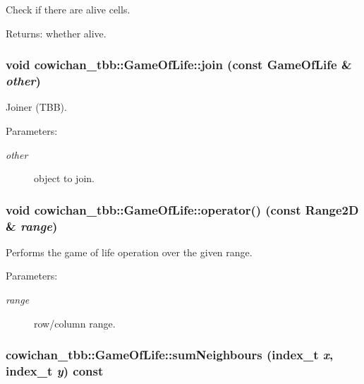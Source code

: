 Check if there are alive cells. \begin{Desc}
\item[Returns:]whether alive. \end{Desc}
\hypertarget{classcowichan__tbb_1_1_game_of_life_c69b9fbc57f35d86238020436b2eb5bb}{
\subsubsection[{join}]{\setlength{\rightskip}{0pt plus 5cm}void cowichan\_\-tbb::GameOfLife::join (const {\bf GameOfLife} \& {\em other})}}
\label{classcowichan__tbb_1_1_game_of_life_c69b9fbc57f35d86238020436b2eb5bb}


Joiner (TBB). \begin{Desc}
\item[Parameters:]
\begin{description}
\item[{\em other}]object to join. \end{description}
\end{Desc}
\hypertarget{classcowichan__tbb_1_1_game_of_life_f6bab39a7e2ab18a6a5834b914d0cc9c}{
\subsubsection[{operator()}]{\setlength{\rightskip}{0pt plus 5cm}void cowichan\_\-tbb::GameOfLife::operator() (const {\bf Range2D} \& {\em range})}}
\label{classcowichan__tbb_1_1_game_of_life_f6bab39a7e2ab18a6a5834b914d0cc9c}


Performs the game of life operation over the given range. \begin{Desc}
\item[Parameters:]
\begin{description}
\item[{\em range}]row/column range. \end{description}
\end{Desc}
\hypertarget{classcowichan__tbb_1_1_game_of_life_cfdc8525672ceaf09c57f0e302320de7}{
\subsubsection[{sumNeighbours}]{ cowichan\_\-tbb::GameOfLife::sumNeighbours ({\bf index\_\-t} {\em x}, \/  {\bf index\_\-t} {\em y}) const}}
\label{classcowichan__tbb_1_1_game_of_life_cfdc8525672ceaf09c57f0e302320de7}



